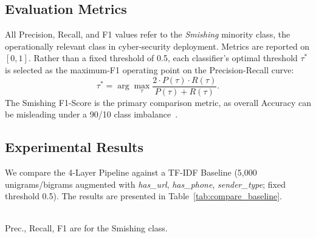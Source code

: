 \documentclass[conference]{IEEEtran}
\begin{document}
\subsection{Evaluation Metrics}
 
All Precision, Recall, and F1 values refer to the \textit{Smishing} minority
class, the operationally relevant class in cyber-security deployment. Metrics
are reported on $[0,1]$. Rather than a fixed threshold of 0.5, each
classifier's optimal threshold $\tau^{*}$ is selected as the maximum-F1
operating point on the Precision-Recall curve:
\[
  \tau^{*} = \arg\max_{\tau}
    \frac{2 \cdot P(\tau)\cdot R(\tau)}{P(\tau)+R(\tau)}.
\]
The Smishing F1-Score is the primary comparison metric, as overall Accuracy
can be misleading under a 90/10 class imbalance~\cite{he2009imbalanced}.
 
\subsection{Experimental Results}
\label{subsec:comparison}
 
We compare the 4-Layer Pipeline against a TF-IDF Baseline (5,000
unigrams/bigrams augmented with \textit{has\_url}, \textit{has\_phone},
\textit{sender\_type}; fixed threshold 0.5). The results are presented in Table~\ref{tab:compare_baseline}.
 
\begin{table}[htbp]
  \caption{TF-IDF Baseline vs.\ Proposed 4-Layer Linguistic Pipeline}
  \label{tab:compare_baseline}
  \centering
  \\[4pt]
  {\small Prec., Recall, F1 are for the Smishing class.}
\end{table}
 
\end{document}
